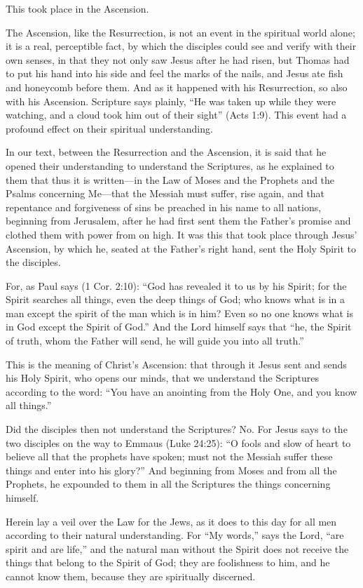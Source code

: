This took place in the Ascension.

The Ascension, like the Resurrection, is not an event in the spiritual world alone; it is a real, perceptible fact, by which the disciples could see and verify with their own senses, in that they not only saw Jesus after he had risen, but Thomas had to put his hand into his side and feel the marks of the nails, and Jesus ate fish and honeycomb before them. And as it happened with his Resurrection, so also with his Ascension. Scripture says plainly, “He was taken up while they were watching, and a cloud took him out of their sight” (Acts 1:9). This event had a profound effect on their spiritual understanding.

In our text, between the Resurrection and the Ascension, it is said that he opened their understanding to understand the Scriptures, as he explained to them that thus it is written—in the Law of Moses and the Prophets and the Psalms concerning Me—that the Messiah must suffer, rise again, and that repentance and forgiveness of sins be preached in his name to all nations, beginning from Jerusalem, after he had first sent them the Father’s promise and clothed them with power from on high. It was this that took place through Jesus’ Ascension, by which he, seated at the Father’s right hand, sent the Holy Spirit to the disciples.

For, as Paul says (1 Cor. 2:10): “God has revealed it to us by his Spirit; for the Spirit searches all things, even the deep things of God; who knows what is in a man except the spirit of the man which is in him? Even so no one knows what is in God except the Spirit of God.” And the Lord himself says that “he, the Spirit of truth, whom the Father will send, he will guide you into all truth.”

This is the meaning of Christ’s Ascension: that through it Jesus sent and sends his Holy Spirit, who opens our minds, that we understand the Scriptures according to the word: “You have an anointing from the Holy One, and you know all things.”

Did the disciples then not understand the Scriptures? No. For Jesus says to the two disciples on the way to Emmaus (Luke 24:25): “O fools and slow of heart to believe all that the prophets have spoken; must not the Messiah suffer these things and enter into his glory?” And beginning from Moses and from all the Prophets, he expounded to them in all the Scriptures the things concerning himself.

Herein lay a veil over the Law for the Jews, as it does to this day for all men according to their natural understanding. For “My words,” says the Lord, “are spirit and are life,” and the natural man without the Spirit does not receive the things that belong to the Spirit of God; they are foolishness to him, and he cannot know them, because they are spiritually discerned.

